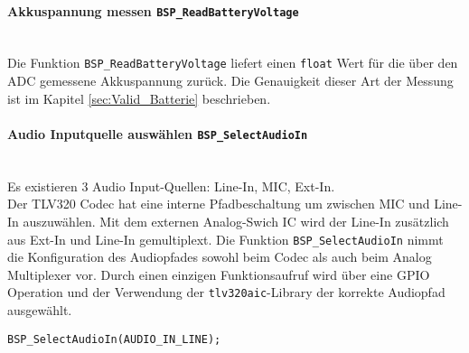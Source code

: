 \paragraph{Akkuspannung messen \texttt{BSP\_ReadBatteryVoltage}}\vspace{-0.3cm}\\
Die Funktion \texttt{BSP\_ReadBatteryVoltage} liefert einen \texttt{float} Wert für die über den ADC gemessene Akkuspannung zurück. 
Die Genauigkeit dieser Art der Messung ist im Kapitel \ref{sec:Valid_Batterie} beschrieben.
\\
\paragraph{Audio Inputquelle auswählen \texttt{BSP\_SelectAudioIn}}\vspace{-0.3cm}\\
Es existieren 3 Audio Input-Quellen: Line-In, MIC, Ext-In.\\
Der TLV320 Codec hat eine interne Pfadbeschaltung um zwischen MIC und Line-In auszuwählen.
Mit dem externen Analog-Swich IC wird der Line-In zusätzlich aus Ext-In und Line-In gemultiplext.
Die Funktion \texttt{BSP\_SelectAudioIn} nimmt die Konfiguration des Audiopfades sowohl  beim Codec als auch beim Analog Multiplexer vor.
Durch einen einzigen Funktionsaufruf wird über eine GPIO Operation und der Verwendung der \texttt{tlv320aic}-Library der korrekte Audiopfad ausgewählt.\\

\begin{lstlisting}[style=Cuvision,caption={Audiopfad Input auf Line-In setzen.}]
BSP_SelectAudioIn(AUDIO_IN_LINE);
\end{lstlisting}



